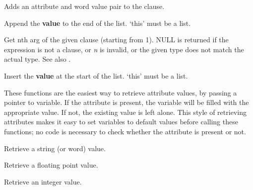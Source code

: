 \label{wxexpraddattributevalueword}


Adds an attribute and word value pair to the clause.

\label{wxexprappend}


Append the {\bf value} to the end of the list. `this' must be a list.

\label{wxexprarg}


Get nth arg of the given clause (starting from 1). NULL is returned if
the expression is not a clause, or {\it n} is invalid, or the given type
does not match the actual type. See also .

\label{wxexprinsert}


Insert the {\bf value} at the start of the list. `this' must be a list.

\label{wxexprgetattributevalue}

These functions are the easiest way to retrieve attribute values, by
passing a pointer to variable. If the attribute is present, the
variable will be filled with the appropriate value.  If not, the
existing value is left alone.  This style of retrieving attributes
makes it easy to set variables to default values before calling these
functions; no code is necessary to check whether the attribute is
present or not.


Retrieve a string (or word) value.


Retrieve a floating point value.


Retrieve an integer value.

